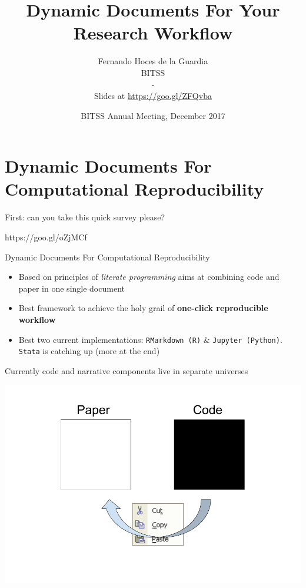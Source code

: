 \documentclass[ignorenonframetext,]{beamer}
\title{Dynamic Documents For Your Research Workflow}
\author{Fernando Hoces de la Guardia\\
BITSS\\
-\\
Slides at \url{https://goo.gl/ZFQvba}}
\date{BITSS Annual Meeting, December 2017}
\providecommand{\tightlist}{%
\setlength{\itemsep}{0pt}\setlength{\parskip}{0pt}}
\begin{document}
\frame{\titlepage}

\begin{frame}
\tableofcontents[hideallsubsections]
\end{frame}

\section{Dynamic Documents For Computational
Reproducibility}\label{dynamic-documents-for-computational-reproducibility}

\begin{frame}{First: can you take this quick survey please?}

\Huge{https://goo.gl/oZjMCf}

\end{frame}

\begin{frame}[fragile]{Dynamic Documents For Computational
Reproducibility}

\begin{itemize}
\tightlist
\item
  Based on principles of \emph{literate programming} aims at combining
  code and paper in one single document
\item
  Best framework to achieve the holy grail of \textbf{one-click
  reproducible workflow}
\item
  Best two current implementations: \texttt{RMarkdown\ (R)} \&
  \texttt{Jupyter\ (Python)}. \texttt{Stata} is catching up (more at the
  end)
\end{itemize}

\end{frame}

\begin{frame}{Currently code and narrative components live in separate
universes}

\includegraphics{./Two universes.png}

\end{frame}
\end{document}
